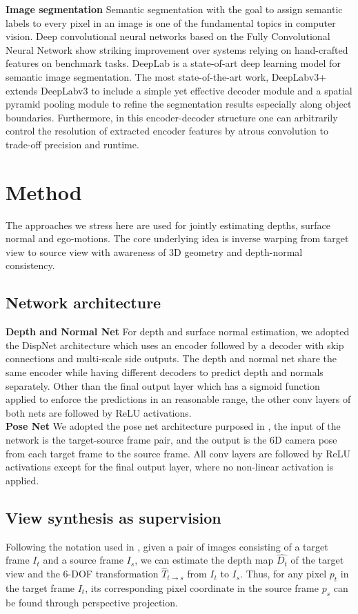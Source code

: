 \documentclass[10pt,twocolumn,letterpaper]{article}
\begin{document}
\textbf{Image segmentation}
Semantic segmentation with the goal to assign semantic labels to every pixel in an image is one of the fundamental topics in computer vision. Deep convolutional neural networks based on the Fully Convolutional Neural Network show striking improvement over systems relying on hand-crafted features on benchmark tasks. DeepLab is a state-of-art deep learning model for semantic image segmentation. The most state-of-the-art work, DeepLabv3+\cite{deeplabv3plus2018} extends DeepLabv3\cite{chen2017rethinking} to include a simple yet effective decoder module and a spatial pyramid pooling module to refine the segmentation results especially along object boundaries. Furthermore, in this encoder-decoder structure one can arbitrarily control the resolution of extracted encoder features by atrous convolution to trade-off precision and runtime.


\section{Method}
The approaches we stress here are used for jointly estimating depths, surface normal and ego-motions. The core underlying idea is inverse warping from target view to source view with awareness of 3D geometry and depth-normal consistency. 
\subsection{Network architecture}
\textbf{Depth and Normal Net}
For depth and surface normal estimation, we adopted the DispNet \cite{mayer2016dispnet} architecture which uses an encoder followed by a decoder with skip connections and multi-scale side outputs. The depth and normal net share the same encoder while having different decoders to predict depth and normals separately. Other than the final output layer which has a sigmoid function applied to enforce the predictions in an reasonable range, the other conv layers of both nets are followed by ReLU activations.\\  
\textbf{Pose Net}
We adopted the pose net architecture purposed in \cite{zhou2017unsupervised}, the input of the network is the target-source frame pair, and the output is the 6D camera pose from each target frame to the source frame. All conv layers are followed by ReLU activations except for the final output layer, where no non-linear activation is applied.
\subsection{View synthesis as supervision}
Following the notation used in \cite{zhou2017unsupervised}, given a pair of images consisting of a target frame $I_t$ and a source frame $I_s$, we can estimate the depth map $\hat{D_t}$ of the target view and the 6-DOF transformation $\hat{T}_{t\xrightarrow{}s}$ from $I_t$ to $I_s$. Thus, for any pixel $p_t$ in the target frame $I_t$, its corresponding pixel coordinate in the source frame $p_s$ can be found through perspective projection. 
\end{document}
